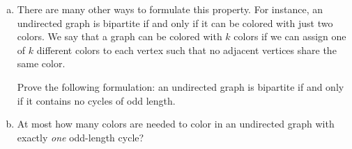 \documentclass[11pt]{article}
\begin{document}
\begin{qunlist}
\begin{enumerate}[(a)]
\item
There are many other ways to formulate this property. For instance, an undirected graph is bipartite if and only if it can be colored with just two colors.
We say that a graph can be colored with $k$ colors if we can assign one of $k$ different colors to each vertex such that no adjacent vertices share the same color.

Prove the following formulation: an undirected graph is bipartite if and only if it contains no cycles of odd length.

\item
At most how many colors are needed to color in an undirected graph with exactly \emph{one} odd-length cycle?

\end{enumerate}
\end{qunlist}
\end{document}
